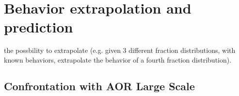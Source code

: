 
\chapter{Behavior extrapolation and prediction}
\label{cap:extrapolation}

the possbility to extrapolate (e.g. given 3 different fraction distributions, with known behaviors, extrapolate the behavior of a fourth fraction distribution).\\

\lipsum[1]

\section{Confrontation with AOR Large Scale}
\label{sec:confrontationaorlargescale}

\lipsum[1]